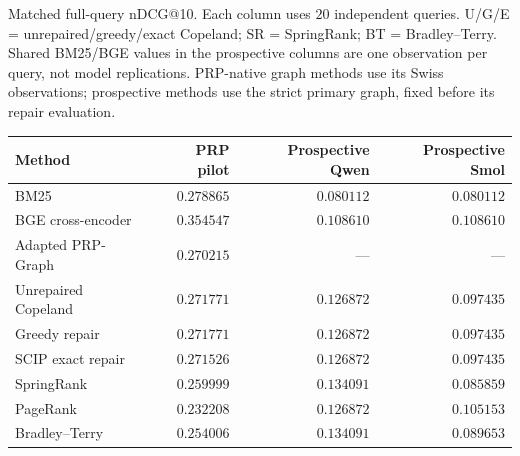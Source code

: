 \begin{supplementtable}
\caption{Matched full-query nDCG@10. Each column uses $20$ independent queries. U/G/E = unrepaired/greedy/exact Copeland; SR = SpringRank; BT = Bradley--Terry. Shared BM25/BGE values in the prospective columns are one observation per query, not model replications. PRP-native graph methods use its Swiss observations; prospective methods use the strict primary graph, fixed before its repair evaluation.}
\label{tab:external-controls}
\sncstable
\begin{tabularx}{\linewidth}{@{}Yrrr@{}}
\toprule
Method & PRP pilot & Prospective Qwen & Prospective Smol \\
\midrule
BM25 & $0.278865$ & $0.080112$ & $0.080112$ \\
BGE cross-encoder & $0.354547$ & $0.108610$ & $0.108610$ \\
Adapted PRP-Graph & $0.270215$ & --- & --- \\
Unrepaired Copeland & $0.271771$ & $0.126872$ & $0.097435$ \\
Greedy repair & $0.271771$ & $0.126872$ & $0.097435$ \\
SCIP exact repair & $0.271526$ & $0.126872$ & $0.097435$ \\
SpringRank & $0.259999$ & $0.134091$ & $0.085859$ \\
PageRank & $0.232208$ & $0.126872$ & $0.105153$ \\
Bradley--Terry & $0.254006$ & $0.134091$ & $0.089653$ \\
\bottomrule
\end{tabularx}
\end{supplementtable}
